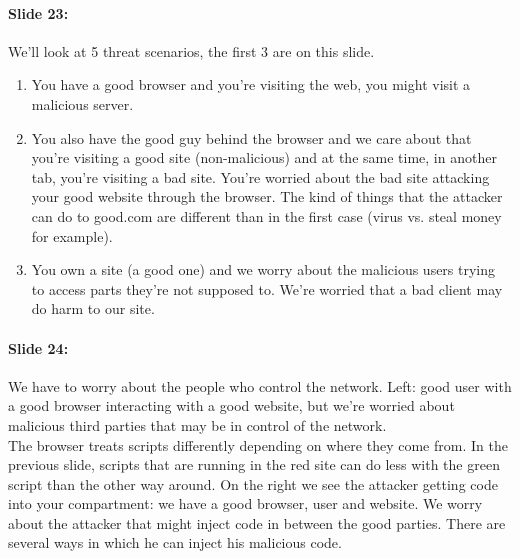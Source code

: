 \documentclass[10pt,a4paper]{report}
\begin{document}
\paragraph{Slide 23:} We'll look at 5 threat scenarios, the first 3 are on this slide. 
\begin{enumerate}
\item You have a good browser and you're visiting the web, you might visit a malicious server.
\item You also have the good guy behind the browser and we care about that you're visiting a good site (non-malicious) and at the same time, in another tab, you're visiting a bad site. You're worried about the bad site attacking your good website through the browser. The kind of things that the attacker can do to good.com are different than in the first case (virus vs. steal money for example). 
\item You own a site (a good one) and we worry about the malicious users trying to access parts they're not supposed to. We're worried that a bad client may do harm to our site.
\end{enumerate}

\paragraph{Slide 24:} We have to worry about the people who control the network. Left: good user with a good browser interacting with a good website, but we're worried about malicious third parties that may be in control of the network. \\
The browser treats scripts differently depending on where they come from. In the previous slide, scripts that are running in the red site can do less with the green script than the other way around.
On the right we see the attacker getting code into your compartment: we have a good browser, user and website. We worry about the attacker that might inject code in between the good parties. There are several ways in which he can inject his malicious code. 
\end{document}
